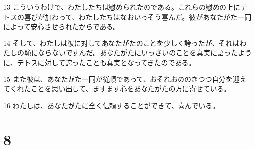 \par 13 こういうわけで、わたしたちは慰められたのである。これらの慰めの上にテトスの喜びが加わって、わたしたちはなおいっそう喜んだ。彼があなたがた一同によって安心させられたからである。
\par 14 そして、わたしは彼に対してあなたがたのことを少しく誇ったが、それはわたしの恥にならないですんだ。あなたがたにいっさいのことを真実に語ったように、テトスに対して誇ったことも真実となってきたのである。
\par 15 また彼は、あなたがた一同が従順であって、おそれおののきつつ自分を迎えてくれたことを思い出して、ますます心をあなたがたの方に寄せている。
\par 16 わたしは、あなたがたに全く信頼することができて、喜んでいる。

\chapter{8}

